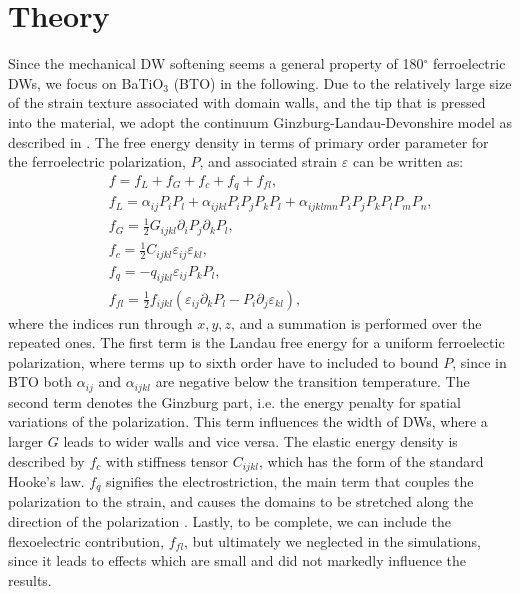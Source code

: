 
\section{Theory}
Since the mechanical DW softening seems a general property of 180$^\circ$ ferroelectric DWs, we focus on BaTiO$_3$ (BTO) in the following.
Due to the relatively large size of the strain texture associated with domain walls, and the tip that is pressed into the material, we adopt the continuum Ginzburg-Landau-Devonshire model as described in \cite{Marton2010}.  
The free energy density in terms of primary order parameter for the ferroelectric polarization, $P$, and associated strain $\varepsilon$ can be written as:
\begin{eqnarray}\label{eq:BTO_energy}
&&f = f_{L}+f_{G}+f_{c}+f_{q}+f_{fl},\\
&&f_{L} = \alpha_{ij}P_iP_l + \alpha_{ijkl}P_{i}P_{j}P_{k}P_{l} + \alpha_{ijklmn} P_i P_j P_k P_l P_m P_n,\\
&&f_{G} = \frac{1}{2}G_{ijkl}\partial_i P_j\partial_k P_l,\\
&&f_{c} = \frac{1}{2}C_{ijkl}\varepsilon_{ij}\varepsilon_{kl},\\
&&f_{q}= - q_{ijkl}\varepsilon_{ij}P_{k}P_{l},\label{eq:qpp}\\
&&f_{fl}=\frac{1}{2}f_{ijkl}(\varepsilon_{ij}\partial_k P_l - P_i\partial_j\varepsilon_{kl}),
\end{eqnarray}
where the indices run through ${x,y,z}$, and a summation is performed over the repeated ones.
The first term is the Landau free energy for a uniform ferroelectic polarization, where terms up to sixth order have to included to bound $P$, since in BTO both $\alpha_{ij}$ and $\alpha_{ijkl}$ are negative below the transition temperature.
The second term denotes the Ginzburg part, i.e. the energy penalty for spatial variations of the polarization.
This term influences the width of DWs, where a larger $G$ leads to wider walls and vice versa.
The elastic energy density is described by $f_c$ with stiffness tensor $C_{ijkl}$, which has the form of the standard Hooke's law.
$f_q$ signifies the electrostriction, the main term that couples the polarization to the strain, and causes the domains to be stretched along the direction of the polarization .
Lastly, to be complete, we can include the flexoelectric contribution, $f_{fl}$, but ultimately we neglected in the simulations, since it leads to effects which are small and did not markedly influence the results.

